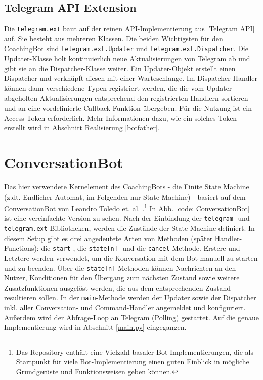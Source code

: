         \subsection{Telegram API Extension}\label{Telegram API Ext}
            Die \verb|telegram.ext| baut auf der reinen API-Implementierung aus \ref{Telegram API} auf. Sie besteht aus mehreren Klassen. Die beiden Wichtigsten für den CoachingBot sind \verb|telegram.ext.Updater| und \verb|telegram.ext.Dispatcher|. Die Updater-Klasse holt kontinuierlich neue Aktualisierungen von Telegram ab und gibt sie an die Dispatcher-Klasse weiter. Ein Updater-Objekt erstellt einen Dispatcher und verknüpft diesen mit einer Warteschlange. Im Dispatcher-Handler können dann verschiedene Typen registriert werden, die die vom Updater abgeholten Aktualisierungen entsprechend den registrierten Handlern sortieren und an eine vordefinierte Callback-Funktion übergeben. Für die Nutzung ist ein Access Token erforderlich.\cite{telegram_ext_intro} Mehr Informationen dazu, wie ein solches Token erstellt wird in Abschnitt Realisierung \ref{botfather}.


    \section{ConversationBot}
        Das hier verwendete Kernelement des CoachingBots - die Finite State Machine (z.dt. Endlicher Automat, im Folgenden nur \glqq State Machine\grqq) - basiert auf dem ConversationBot von Leandro Toledo et. al. \cite{conversationBot}.\footnote{Das Repository enthält eine Vielzahl basaler Bot-Implementierungen, die als Startpunkt für viele Bot-Implementierung einen guten Einblick in mögliche Grundgerüste und Funktionsweisen geben können.} In Abb. \ref{code: ConversationBot} ist eine vereinfachte Version zu sehen. Nach der Einbindung der \verb|telegram|- und \verb|telegram.ext|-Bibliotheken, werden die Zustände der State Machine definiert. In diesem Setup gibt es drei angedeutete Arten von Methoden (später Handler-Functions): die \verb|start|-, die \verb|state[n]|- und die \verb|cancel|-Methode. Erstere und Letztere werden verwendet, um die Konversation mit dem Bot manuell zu starten und zu beenden. Über die \verb|state[n]|-Methoden können Nachrichten an den Nutzer, Konditionen für den Übergang zum nächsten Zustand sowie weitere Zusatzfunktionen ausgelöst werden, die aus dem entsprechenden Zustand resultieren sollen. 
        In der \verb|main|-Methode werden der Updater sowie der Dispatcher inkl. aller Conversation- und Command-Handler angemeldet und konfiguriert. Außerdem wird der Abfrage-Loop an Telegram (Polling) gestartet. Auf die genaue Implementierung wird in Abschnitt \ref{main.py} eingegangen.
        
